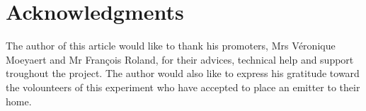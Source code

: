 \documentclass[letterpaper, 10 pt, conference]{ieeeconf}  %
\begin{document}










\section*{Acknowledgments}
The author of this article would like to thank his promoters, Mrs V\'eronique Moeyaert and Mr Fran\c cois Roland, for their advices, technical help and support troughout the project. The author would also like to express his gratitude toward the volounteers of this experiment who have accepted to place an emitter to their home.




\end{document}
